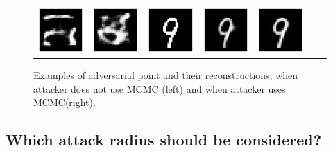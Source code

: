 \begin{figure}[h]
\begin{tabular}{cccc|ccc}
         \includegraphics[width=0.1\linewidth]{pics/3_adv_att/mnist_MCMC/mnist_noMCMC_adv_rec_3_rad_1.0.pdf} & 
          \includegraphics[width=0.1\linewidth]{pics/3_adv_att/mnist_MCMC/mnist_noMCMC_adv_rec_t_3_rad_1.0.pdf} &
           \includegraphics[width=0.1\linewidth]{pics/3_adv_att/mnist_MCMC/mnist_MCMC_adv_3_rad_1.0.pdf} &
           \includegraphics[width=0.1\linewidth]{pics/3_adv_att/mnist_MCMC/mnist_MCMC_adv_rec_3_rad_1.0.pdf} &
           \includegraphics[width=0.1\linewidth]{pics/3_adv_att/mnist_MCMC/mnist_MCMC_adv_rec_t_3_rad_1.0.pdf} \\
    \end{tabular}
    \caption{Examples of adversarial point and their reconstructions, when attacker does not use MCMC (left) and when attacker uses MCMC(right).}
    \label{fig:mcmc_attack_example}
        \vspace*{2\baselineskip}
\end{figure}


\newpage



\subsection{Which attack radius should be considered?}\label{appendix:attack_radius}

